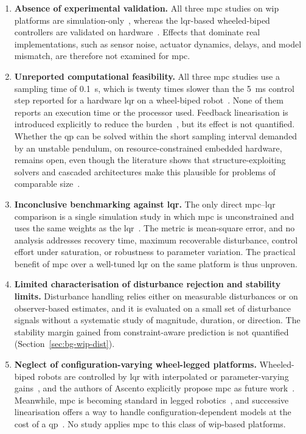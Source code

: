 \begin{enumerate}
\item \textbf{Absence of experimental validation.} All three \ac{mpc} studies on \ac{wip} platforms are simulation-only~\cite{minouchehr2015,yue2018tsmc,yue2018ijcas}, whereas the \ac{lqr}-based wheeled-biped controllers are validated on hardware~\cite{klemm2019,zhang2022}. Effects that dominate real implementations, such as sensor noise, actuator dynamics, delays, and model mismatch, are therefore not examined for \ac{mpc}.
\item \textbf{Unreported computational feasibility.} All three \ac{mpc} studies use a sampling time of 0.1~s, which is twenty times slower than the 5~ms control step reported for a hardware \ac{lqr} on a wheel-biped robot~\cite{zhang2022}. None of them reports an execution time or the processor used. Feedback linearisation is introduced explicitly to reduce the burden~\cite{yue2018ijcas}, but its effect is not quantified. Whether the \ac{qp} can be solved within the short sampling interval demanded by an unstable pendulum, on resource-constrained embedded hardware, remains open, even though the literature shows that structure-exploiting solvers and cascaded architectures make this plausible for problems of comparable size~\cite{wang2010,kamel2017}.
\item \textbf{Inconclusive benchmarking against \ac{lqr}.} The only direct \ac{mpc}--\ac{lqr} comparison is a single simulation study in which \ac{mpc} is unconstrained and uses the same weights as the \ac{lqr}~\cite{minouchehr2015}. The metric is mean-square error, and no analysis addresses recovery time, maximum recoverable disturbance, control effort under saturation, or robustness to parameter variation. The practical benefit of \ac{mpc} over a well-tuned \ac{lqr} on the same platform is thus unproven.
\item \textbf{Limited characterisation of disturbance rejection and stability limits.} Disturbance handling relies either on measurable disturbances or on observer-based estimates, and it is evaluated on a small set of disturbance signals without a systematic study of magnitude, duration, or direction. The stability margin gained from constraint-aware prediction is not quantified (Section~\ref{sec:bg-wip-dist}).
\item \textbf{Neglect of configuration-varying wheel-legged platforms.} Wheeled-biped robots are controlled by \ac{lqr} with interpolated or parameter-varying gains~\cite{klemm2019,zhang2022}, and the authors of Ascento explicitly propose \ac{mpc} as future work~\cite{klemm2019}. Meanwhile, \ac{mpc} is becoming standard in legged robotics~\cite{katayama2023}, and successive linearisation offers a way to handle configuration-dependent models at the cost of a \ac{qp}~\cite{kuhne2004}. No study applies \ac{mpc} to this class of \ac{wip}-based platforms.
\end{enumerate}


